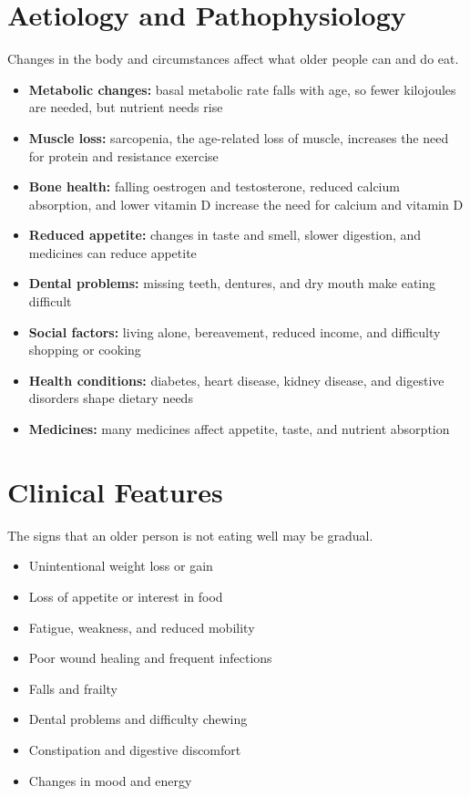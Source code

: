 \section*{Aetiology and Pathophysiology}
Changes in the body and circumstances affect what older people can and do eat.
\begin{itemize}
    \item \textbf{Metabolic changes:} basal metabolic rate falls with age, so fewer kilojoules are needed, but nutrient needs rise
    \item \textbf{Muscle loss:} sarcopenia, the age-related loss of muscle, increases the need for protein and resistance exercise
    \item \textbf{Bone health:} falling oestrogen and testosterone, reduced calcium absorption, and lower vitamin D increase the need for calcium and vitamin D
    \item \textbf{Reduced appetite:} changes in taste and smell, slower digestion, and medicines can reduce appetite
    \item \textbf{Dental problems:} missing teeth, dentures, and dry mouth make eating difficult
    \item \textbf{Social factors:} living alone, bereavement, reduced income, and difficulty shopping or cooking
    \item \textbf{Health conditions:} diabetes, heart disease, kidney disease, and digestive disorders shape dietary needs
    \item \textbf{Medicines:} many medicines affect appetite, taste, and nutrient absorption
\end{itemize}

\section*{Clinical Features}
The signs that an older person is not eating well may be gradual.
\begin{itemize}
    \item Unintentional weight loss or gain
    \item Loss of appetite or interest in food
    \item Fatigue, weakness, and reduced mobility
    \item Poor wound healing and frequent infections
    \item Falls and frailty
    \item Dental problems and difficulty chewing
    \item Constipation and digestive discomfort
    \item Changes in mood and energy
\end{itemize}

